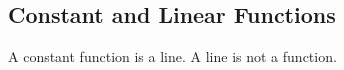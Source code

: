 \subsection{Constant and Linear Functions} 
\begin{Note}
A constant function is a \makeblank[1.5in] line. A \makeblank[1.5in] line is not a function.
\end{Note}